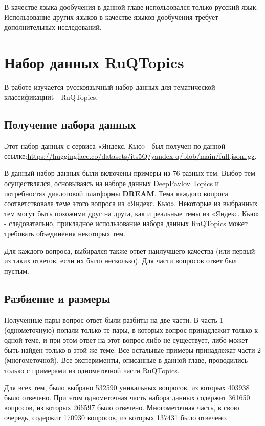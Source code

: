 В качестве языка дообучения в данной главе использовался только русский язык. Использование других языков в качестве языков дообучения требует дополнительных исследований.

\section{Набор данных {RuQTopics}}

В работе изучается русскоязычный набор данных для тематической классификацииt - {RuQTopics}.
\subsection{Получение набора данных}
Этот набор данных с сервиса «Яндекс. Кью»~\cite{yandex_q} был получен по данной ссылке:\url{https://huggingface.co/datasets/its5Q/yandex-q/blob/main/full.jsonl.gz}.

В данный набор данных были включены примеры из 76 разных тем. Выбор тем осуществлялся, основываясь на наборе данных {DeepPavlov Topics} и потребностях диалоговой платформы \textbf{DREAM}. Тема каждого вопроса соответствовала теме этого вопроса из «Яндекс. Кью». Некоторые из выбранных тем могут быть похожими друг на друга, как и реальные темы из «Яндекс. Кью» - следовательно, прикладное использование набора данных {RuQTopics} может требовать объединения некоторых тем.

 Для каждого вопроса, выбирался также ответ наилучшего качества (или первый из таких ответов, если их было несколько). Для части вопросов ответ был пустым. 
 


\subsection{Разбиение и размеры}
Полученные пары вопрос-ответ были разбиты на две части. В часть 1 (однометочную) попали только те пары, в которых вопрос принадлежит только к одной теме, и при этом ответ на этот вопрос либо не существует, либо может быть найден только в этой же теме. Все остальные примеры принадлежат части 2 (многометочной). Все эксперименты, описанные в данной главе, проводились только с примерами из однометочной части {RuQTopics}.


Для всех тем, было выбрано 532590 уникальных вопросов, из которых 403938 было отвечено. При этом однометочная часть набора данных содержит 361650 вопросов, из которых 266597 было отвечено. Многометочная часть, в свою очередь, содержит 170930 вопросов, из которых 137431 было отвечено.


